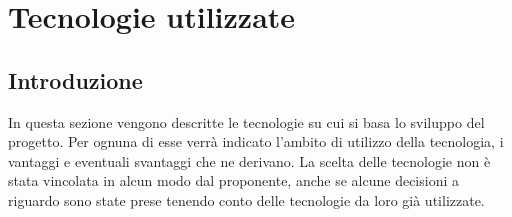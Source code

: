 \newpage

\section{Tecnologie utilizzate}
\label{tecnologie}
\subsection{Introduzione}
In questa sezione vengono descritte le tecnologie su cui si basa lo sviluppo del progetto. Per ognuna di esse verrà indicato l'ambito di utilizzo della tecnologia, i vantaggi e eventuali svantaggi che ne derivano. La scelta delle tecnologie non è stata vincolata in alcun modo dal proponente, anche se alcune decisioni a riguardo sono state prese tenendo conto delle tecnologie da loro già utilizzate.

